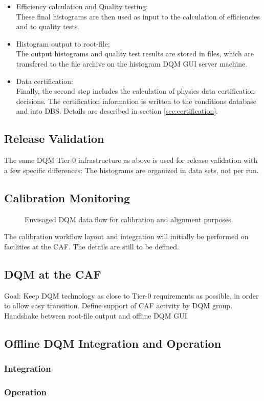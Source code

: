 \begin{itemize}
\item{Efficiency calculation and Quality testing:\\}
These final histograms are then used as input to the calculation
of efficiencies and to quality tests.
\item{Histogram output to root-file;\\}
The output histograms and quality test results are stored in files, 
which are transfered to the file archive on the histogram DQM GUI server machine.
\item{Data certification:\\} 
Finally, the second step includes the calculation of physics data 
certification decisions. The certification information is written to the 
conditions database and into DBS. Details are described in section 
\ref{sec:certification}.
\end{itemize}

\subsection{Release Validation}

The same DQM Tier-0 infrastructure as above is used for release validation
with a few specific differences: The histograms are organized in data sets,
not per run.

\subsection{Calibration Monitoring}

\begin{figure}[!htbp]
\begin{center}
\caption{Envisaged DQM data flow for calibration and alignment purposes.}
\end{center}
\label{fig:dqmalca}
\end{figure}

The calibration workflow layout and integration will initially be performed 
on facilities at the CAF. The details are still to be defined.

\subsection{DQM at the CAF}
\label{sec:caf}

Goal: Keep DQM technology as close to Tier-0 requirements as possible,
in order to allow easy transition.
Define support of CAF activity by DQM group.
Handshake between root-file output and offline DQM GUI

\subsection{Offline DQM Integration and Operation}

\subsubsection*{Integration}

\subsubsection*{Operation}
